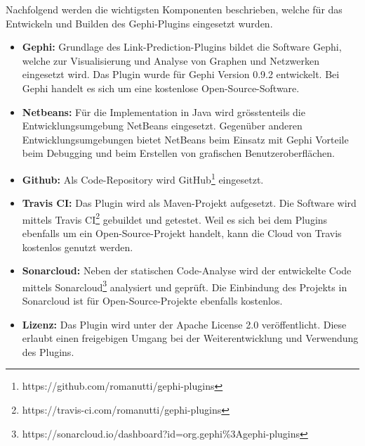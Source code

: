 Nachfolgend werden die wichtigsten Komponenten beschrieben, welche für das Entwickeln und Builden des Gephi-Plugins eingesetzt wurden.

\begin{itemize}
    \item \textbf{Gephi:} Grundlage des Link-Prediction-Plugins bildet die Software Gephi, welche zur Visualisierung und Analyse von Graphen und Netzwerken eingesetzt wird. Das Plugin wurde für Gephi Version 0.9.2 entwickelt. Bei Gephi handelt es sich um eine kostenlose Open-Source-Software.
    \item \textbf{Netbeans:} Für die Implementation in Java wird grösstenteils die Entwicklungsumgebung NetBeans eingesetzt. Gegenüber anderen Entwicklungsumgebungen bietet NetBeans beim Einsatz mit Gephi Vorteile beim Debugging und beim Erstellen von grafischen Benutzeroberflächen.
    \item \textbf{Github:} Als Code-Repository wird GitHub\footnote{https://github.com/romanutti/gephi-plugins} eingesetzt.
    \item \textbf{Travis CI:} Das Plugin wird als Maven-Projekt aufgesetzt. Die Software wird mittels Travis CI\footnote{https://travis-ci.com/romanutti/gephi-plugins} gebuildet und getestet. Weil es sich bei dem Plugins ebenfalls um ein Open-Source-Projekt handelt, kann die Cloud von Travis kostenlos genutzt werden.
    \item \textbf{Sonarcloud:} Neben der statischen Code-Analyse wird der entwickelte Code mittels Sonarcloud\footnote{https://sonarcloud.io/dashboard?id=org.gephi\%3Agephi-plugins} analysiert und geprüft. Die Einbindung des Projekts in Sonarcloud ist für Open-Source-Projekte ebenfalls kostenlos.
    \item \textbf{Lizenz:} Das Plugin wird unter der Apache License 2.0 veröffentlicht. Diese erlaubt einen freigebigen Umgang bei der Weiterentwicklung und Verwendung des Plugins.
\end{itemize}
